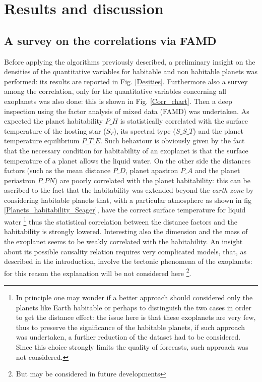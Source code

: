 \documentclass[
12pt, %
a4paper, %
oneside, %
headinclude,footinclude, %
BCOR5mm, %
]{scrartcl}
\begin{document}
\section{Results and discussion}


\subsection{A survey on the correlations via FAMD}

Before applying the algorithms previously described, a preliminary insight on the densities of the quantitative variables for habitable and non habitable planets was performed: its results are reported in Fig. \ref{Desities}. Furthermore also a survey among the correlation, only for the quantitative variables concerning all exoplanets was also done: this is shown in Fig. \ref{Corr_chart}. Then a deep inspection using the factor analysis of mixed data (FAMD) was undertaken.  As expected the planet habitability $P\_H$ is statistically correlated with the surface temperature of the hosting star ($S_T$), its spectral type ($S\_S\_T$) and the planet temperature equilibrium $P\_T\_E$. Such behaviour is obviously given by the fact that the necessary condition for habitability of an exoplanet is that the surface temperature of a planet allows the liquid water. On the other side the distances factors (such as the mean distance $P\_D$, planet apastron $P\_A$ and the planet periastron $P\_PN$) are poorly correlated with the planet habitability: this can be ascribed to the fact that the habitability was extended beyond the \textit{earth zone} by considering habitable planets that, with a particular atmosphere as shown in fig \ref{Planets_habitability_Seager}, have the correct surface temperature for liquid water
\footnote{In principle one may wonder if a better approach should considered only the planets like Earth habitable or perhaps to distinguish the two cases in order to get the distance effect: the issue here is that these exoplanets are very few, thus to preserve the significance of the habitable planets, if such approach was undertaken, a further reduction of the dataset had to be considered. Since this choice strongly limits the quality of forecasts, such approach was not considered.} thus the statistical correlation between the distance factors and the habitability is strongly lowered. Interesting also the dimension and the mass of the exoplanet seems to be weakly correlated with the habitability. An insight about its possible causality relation requires very complicated models, that, as described in the introduction, involve the tectonic phenomena of the exoplanets: for this reason the explanation will be not considered here \footnote{But may be considered in future developments}.
\end{document}
